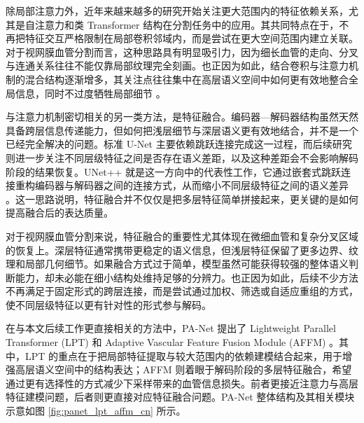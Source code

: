\documentclass[a4paper,12pt]{article}
\begin{document}
除局部注意力外，近年来越来越多的研究开始关注更大范围内的特征依赖关系，尤其是自注意力和类 Transformer 结构在分割任务中的应用。其共同特点在于，不再把特征交互严格限制在局部卷积邻域内，而是尝试在更大空间范围内建立关联。对于视网膜血管分割而言，这种思路具有明显吸引力，因为细长血管的走向、分叉与连通关系往往不能仅靠局部纹理完全刻画。也正因为如此，结合卷积与注意力机制的混合结构逐渐增多，其关注点往往集中在高层语义空间中如何更有效地整合全局信息，同时不过度牺牲局部细节 \cite{luo2025panet,zhu2021deformabledetr,chen2024transunet,cao2021swinunet}。

与注意力机制密切相关的另一类方法，是特征融合。编码器—解码器结构虽然天然具备跨层信息传递能力，但如何把浅层细节与深层语义更有效地结合，并不是一个已经完全解决的问题。标准 U-Net 主要依赖跳跃连接完成这一过程，而后续研究则进一步关注不同层级特征之间是否存在语义差距，以及这种差距会不会影响解码阶段的结果恢复。UNet++ 就是这一方向中的代表性工作，它通过嵌套式跳跃连接重构编码器与解码器之间的连接方式，从而缩小不同层级特征之间的语义差异 \cite{zhou2018unetpp}。这一思路说明，特征融合并不仅仅是把多层特征简单拼接起来，更关键的是如何提高融合后的表达质量。

对于视网膜血管分割来说，特征融合的重要性尤其体现在微细血管和复杂分叉区域的恢复上。深层特征通常携带更稳定的语义信息，但浅层特征保留了更多边界、纹理和局部几何细节。如果融合方式过于简单，模型虽然可能获得较强的整体语义判断能力，却未必能在细小结构处维持足够的分辨力。也正因为如此，后续不少方法不再满足于固定形式的跨层连接，而是尝试通过加权、筛选或自适应重组的方式，使不同层级特征以更有针对性的形式参与解码。

在与本文后续工作更直接相关的方法中，PA-Net 提出了 Lightweight Parallel Transformer (LPT) 和 Adaptive Vascular Feature Fusion Module (AFFM) \cite{luo2025panet}。其中，LPT 的重点在于把局部特征提取与较大范围内的依赖建模结合起来，用于增强高层语义空间中的结构表达；AFFM 则着眼于解码阶段的多层特征融合，希望通过更有选择性的方式减少下采样带来的血管信息损失。前者更接近注意力与高层特征建模问题，后者则更直接对应特征融合问题。PA-Net 整体结构及其相关模块示意如图 \ref{fig:panet_lpt_affm_cn} 所示。
\end{document}
